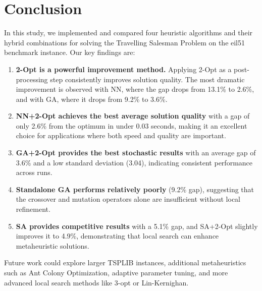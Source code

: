 \documentclass[conference]{IEEEtran}
\begin{document}
\section{Conclusion}

In this study, we implemented and compared four heuristic algorithms and their hybrid combinations for solving the Travelling Salesman Problem on the eil51 benchmark instance. Our key findings are:

\begin{enumerate}
    \item \textbf{2-Opt is a powerful improvement method.} Applying 2-Opt as a post-processing step consistently improves solution quality. The most dramatic improvement is observed with NN, where the gap drops from 13.1\% to 2.6\%, and with GA, where it drops from 9.2\% to 3.6\%.
    \item \textbf{NN+2-Opt achieves the best average solution quality} with a gap of only 2.6\% from the optimum in under 0.03 seconds, making it an excellent choice for applications where both speed and quality are important.
    \item \textbf{GA+2-Opt provides the best stochastic results} with an average gap of 3.6\% and a low standard deviation (3.04), indicating consistent performance across runs.
    \item \textbf{Standalone GA performs relatively poorly} (9.2\% gap), suggesting that the crossover and mutation operators alone are insufficient without local refinement.
    \item \textbf{SA provides competitive results} with a 5.1\% gap, and SA+2-Opt slightly improves it to 4.9\%, demonstrating that local search can enhance metaheuristic solutions.
\end{enumerate}

Future work could explore larger TSPLIB instances, additional metaheuristics such as Ant Colony Optimization, adaptive parameter tuning, and more advanced local search methods like 3-opt or Lin-Kernighan.



\end{document}
